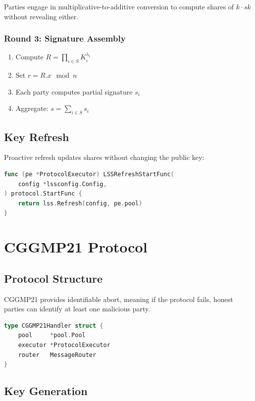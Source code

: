 \documentclass[11pt,twocolumn]{article}
\begin{document}
Parties engage in multiplicative-to-additive conversion to compute shares of $k \cdot sk$ without revealing either.

\subsubsection{Round 3: Signature Assembly}

\begin{enumerate}
\item Compute $R = \prod_{i \in S} K_i^{\lambda_i}$
\item Set $r = R.x \mod n$
\item Each party computes partial signature $s_i$
\item Aggregate: $s = \sum_{i \in S} s_i$
\end{enumerate}

\subsection{Key Refresh}

Proactive refresh updates shares without changing the public key:

\begin{lstlisting}[language=Go,basicstyle=\ttfamily\small]
func (pe *ProtocolExecutor) LSSRefreshStartFunc(
    config *lssconfig.Config,
) protocol.StartFunc {
    return lss.Refresh(config, pe.pool)
}
\end{lstlisting}

\section{CGGMP21 Protocol}

\subsection{Protocol Structure}

CGGMP21 provides identifiable abort, meaning if the protocol fails, honest parties can identify at least one malicious party.

\begin{lstlisting}[language=Go,basicstyle=\ttfamily\small]
type CGGMP21Handler struct {
    pool     *pool.Pool
    executor *ProtocolExecutor
    router   MessageRouter
}
\end{lstlisting}

\subsection{Key Generation}
\end{document}
